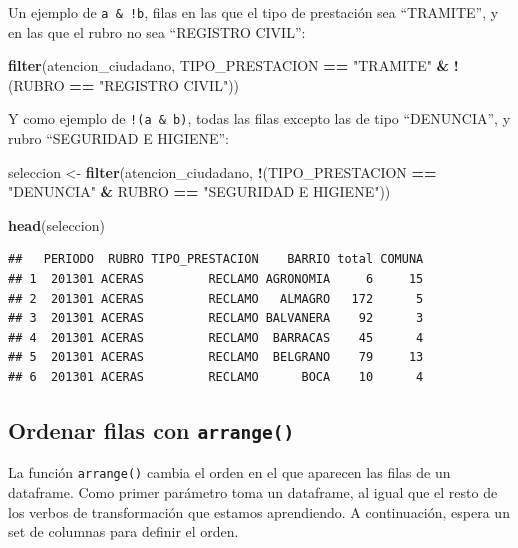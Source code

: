 \documentclass[spanish,]{book}
\newenvironment{Shaded}{\begin{snugshade}}{\end{snugshade}}
\newcommand{\KeywordTok}[1]{\textcolor[rgb]{0.13,0.29,0.53}{\textbf{#1}}}
\newcommand{\NormalTok}[1]{#1}
\newcommand{\OperatorTok}[1]{\textcolor[rgb]{0.81,0.36,0.00}{\textbf{#1}}}
\newcommand{\StringTok}[1]{\textcolor[rgb]{0.31,0.60,0.02}{#1}}
\begin{document}
Un ejemplo de \texttt{a\ \&\ !b}, filas en las que el tipo de prestación sea ``TRAMITE'', y en las que el rubro no sea ``REGISTRO CIVIL'':

\begin{Shaded}
\begin{Highlighting}[]
\KeywordTok{filter}\NormalTok{(atencion_ciudadano, TIPO_PRESTACION }\OperatorTok{==}\StringTok{ "TRAMITE"} \OperatorTok{&}\StringTok{ }\OperatorTok{!}\NormalTok{(RUBRO }\OperatorTok{==}\StringTok{ "REGISTRO CIVIL"}\NormalTok{))}
\end{Highlighting}
\end{Shaded}

Y como ejemplo de \texttt{!(a\ \&\ b)}, todas las filas excepto las de tipo ``DENUNCIA'', y rubro ``SEGURIDAD E HIGIENE'':

\begin{Shaded}
\begin{Highlighting}[]
\NormalTok{seleccion <-}\StringTok{ }\KeywordTok{filter}\NormalTok{(atencion_ciudadano, }\OperatorTok{!}\NormalTok{(TIPO_PRESTACION }\OperatorTok{==}\StringTok{ "DENUNCIA"} \OperatorTok{&}\StringTok{ }\NormalTok{RUBRO }\OperatorTok{==}\StringTok{ "SEGURIDAD E HIGIENE"}\NormalTok{))}

\KeywordTok{head}\NormalTok{(seleccion)}
\end{Highlighting}
\end{Shaded}

\begin{verbatim}
##   PERIODO  RUBRO TIPO_PRESTACION    BARRIO total COMUNA
## 1  201301 ACERAS         RECLAMO AGRONOMIA     6     15
## 2  201301 ACERAS         RECLAMO   ALMAGRO   172      5
## 3  201301 ACERAS         RECLAMO BALVANERA    92      3
## 4  201301 ACERAS         RECLAMO  BARRACAS    45      4
## 5  201301 ACERAS         RECLAMO  BELGRANO    79     13
## 6  201301 ACERAS         RECLAMO      BOCA    10      4
\end{verbatim}

\hypertarget{ordenar-filas-con-arrange}{%
\subsection{\texorpdfstring{Ordenar filas con \texttt{arrange()}}{Ordenar filas con arrange()}}\label{ordenar-filas-con-arrange}}

La función \texttt{arrange()} cambia el orden en el que aparecen las filas de un dataframe. Como primer parámetro toma un dataframe, al igual que el resto de los verbos de transformación que estamos aprendiendo. A continuación, espera un set de columnas para definir el orden.
\end{document}
